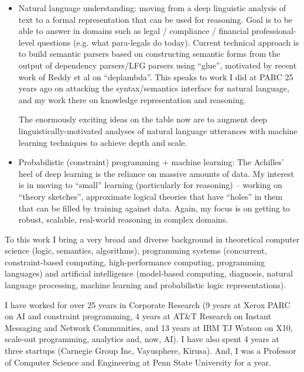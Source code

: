 \documentclass{article}
\begin{document}
\begin{itemize}

\item Natural language understanding: moving from a deep linguistic
  analysis of text to a formal representation that can be used for
  reasoning. Goal is to be able to answer in domains such as legal /
  compliance / financial professional-level questions (e.g. what
  para-legals do today). Current technical approach is to build
  semantic parsers based on constructing semantic forms from the
  output of dependency parsers/LFG parsers using ``glue'', motivated
  by recent work of Reddy et al on ``deplambda''. This speaks to work
  I did at PARC 25 years ago on attacking the syntax/semantics
  interface for natural language, and my work there on knowledge
  representation and reasoning. 

  The enormously exciting ideas on the table now are to augment deep
  linguistically-motivated analyses of natural language utterances
  with machine learning techniques to achieve depth and scale. 

\item  Probabilistic (constraint) programming + machine learning: The
  Achilles' heel of deep learning is the reliance on massive amounts
  of data. My interest is in moving to ``small'' learning
  (particularly for reasoning) -- working on ``theory sketches'',
  approximate logical theories that have ``holes'' in them that can be
  filled by training against data. Again, my focus is on getting to
  robust, scalable, real-world reasoning in complex domains. 
\end{itemize}

To this work I bring a very broad and diverse background in
theoretical computer science (logic, semantics,  algorithms),
programming systems (concurrent, constraint-based computing,
high-performance computing, programming languages) and artificial
intelligence (model-based computing, diagnosis, natural language
processing, machine learning and probabilistic 
logic representations).   

I have worked for over 25 years in Corporate Research (9 years at
Xerox PARC on AI and constraint programming, 4 years at AT\&T Research
on Instant Messaging and Network Communities, and 13 years at IBM TJ Watson on
X10, scale-out programming, analytics and, now, AI). I have also spent 4 years
at three startups (Carnegie Group Inc, Vayusphere, Kirusa). And, I was a
Professor of Computer Science and Engineering at Penn State University
for a year.  
\end{document}
